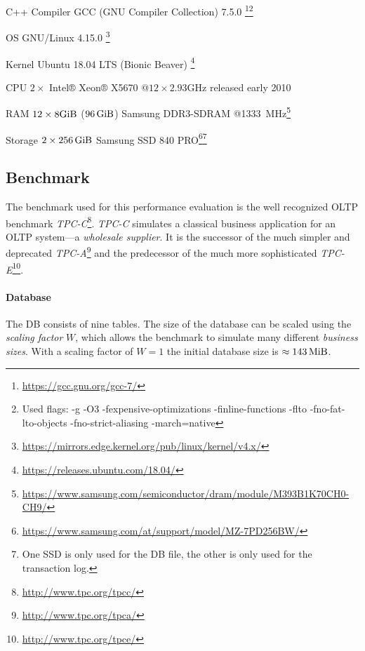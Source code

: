     \begin{labeleddescription}
        \item[C++ Compiler] \label{intab:compiler} GCC (GNU Compiler Collection) 7.5.0 \footnote{\url{https://gcc.gnu.org/gcc-7/}}\footnote{Used flags: -g -O3 -fexpensive-optimizations -finline-functions -flto -fno-fat-lto-objects -fno-strict-aliasing -march=native}
        \item[OS]       \label{intab:os}     GNU/Linux 4.15.0 \footnote{\url{https://mirrors.edge.kernel.org/pub/linux/kernel/v4.x/}}
        \item[Kernel]   \label{intab:kernel} Ubuntu 18.04 LTS (Bionic Beaver) \footnote{\url{https://releases.ubuntu.com/18.04/}}
        \item[CPU]      \label{intab:cpu}    $2 \times $ Intel® Xeon® X5670 @$12 \times 2.93$\si{\giga\hertz} released early 2010
        \item[RAM]      \label{intab:ram}    $12 \times 8\si{\gibi\byte}$ ($\SI{96}{\gibi\byte}$) Samsung DDR3-SDRAM @\SI{1333}{\mega\hertz}\footnote{\url{https://www.samsung.com/semiconductor/dram/module/M393B1K70CH0-CH9/}}
        \item[Storage]  \label{intab:storage} $2 \times \SI{256}{\gibi\byte}$ Samsung SSD 840 PRO\footnote{\url{https://www.samsung.com/at/support/model/MZ-7PD256BW/}}\footnote{One SSD is only used for the DB file, the other is only used for the transaction log.}
    \end{labeleddescription}

\subsection{Benchmark} \label{subsec:page_evictioners_benchmark}

    The benchmark used for this performance evaluation is the well recognized OLTP benchmark \textit{TPC-C}\footnote{\url{http://www.tpc.org/tpcc/}}. \textit{TPC-C} simulates a classical business application for an OLTP system---a \emph{wholesale supplier}. It is the successor of the much simpler and deprecated \textit{TPC-A}\footnote{\url{http://www.tpc.org/tpca/}} and the predecessor of the much more sophisticated \textit{TPC-E}\footnote{\url{http://www.tpc.org/tpce/}}.

\paragraph{Database}

    The DB consists of nine tables. The size of the database can be scaled using the \emph{scaling factor} $W$, which allows the benchmark to simulate many different \emph{business sizes}. With a scaling factor of $W = 1$ the initial database size is $\approx\SI{143}{\mebi\byte}$.

